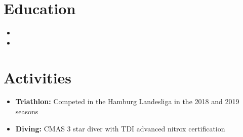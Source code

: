 \documentclass{myfancycv}
\begin{document}
\section{Education}
  \vspace*{-0.5em}

\begin{itemize}
\item{}
\item{}
\end{itemize}

  \vspace*{-0.9em}
\section{Activities}

\begin{itemize}
  \vspace*{-0.5em}
	\item {\bf Triathlon:} Competed in the Hamburg Landesliga in the 2018 and 2019 seasons
	\item {\bf Diving:} CMAS 3 star diver with TDI advanced nitrox certification
\end{itemize}
\end{document}

